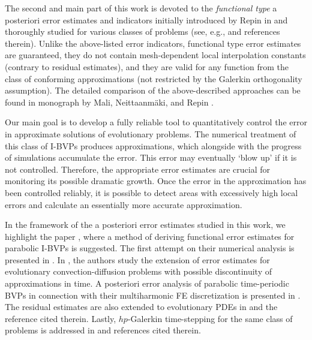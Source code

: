 The second and main part of this work is devoted to the \emph{functional type} a 
posteriori error estimates and indicators initially introduced by Repin in 
\cite{Repin1997, RepinPowerFunc1997, Repin1999, Repin2000} and thoroughly studied 
for various classes of problems (see, e.g., \cite{NeittaanmakiRepin2004, 
RepinDeGruyter2008, Malietall2014} and references therein). Unlike the above-listed 
error indicators, functional type error estimates are guaranteed, they do not contain 
mesh-dependent local interpolation constants (contrary to residual estimates), and 
they are valid for any function from the class of conforming approximations (not 
restricted by the Galerkin orthogonality assumption). The detailed comparison of the
above-described approaches can be found in monograph by Mali, 
Neittaanm{\"a}ki, and Repin \cite{Malietall2014}.

Our main goal is to develop a fully reliable tool to quantitatively control the error 
in approximate solutions of evolutionary problems. The numerical treatment of this 
class of I-BVPs produces approximations, which alongside with the progress of 
simulations accumulate the error. This error may eventually `blow up' if it is 
not controlled. Therefore, the appropriate error estimates are crucial for 
monitoring its possible dramatic growth. Once the error in 
the approximation has been controlled reliably, it is possible to detect areas with 
excessively high local errors and calculate an essentially more accurate 
approximation.

In the framework of the a posteriori error estimates studied in this work, we highlight 
the paper \cite{Repin2002}, where a method of deriving functional error 
estimates for parabolic I-BVPs is suggested. The first attempt on their numerical analysis 
is presented in \cite{GaevskayaRepin2005}. In \cite{RepinTomar2010}, the authors 
study the extension of error estimates for evolutionary convection-diffusion 
problems with 
possible discontinuity of approximations in time. A posteriori error analysis of 
parabolic time-periodic BVPs in connection with their multiharmonic FE 
discretization is presented in \cite{LangerRepinWolfmayr2014}. The residual 
estimates are also extended to evolutionary PDEs in  
\cite{Verfurth2003, BangerthRannacher2003, Vexler2008, Meidneretall2011, 
BesierRannacher2012, RichterSpringerVexler2013} and the reference cited therein.
Lastly, $hp$-Galerkin time-stepping for the same 
class of problems is addressed in \cite{Johnson1988,SchotzauSchwab2000,
SchotzauWihler2010} and references cited therein. 



